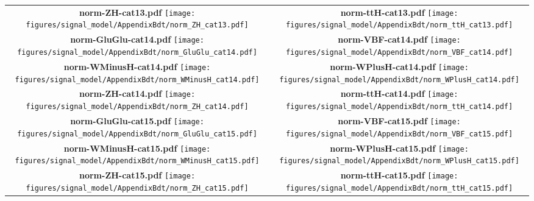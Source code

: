 \begin{longtable}{|c|c|}
{}
 \\
\hline
\parbox{0.47\textwidth}{
\centering
{\bfseries norm-ZH-cat13.pdf}
\texttt{[image: figures/signal\_model/AppendixBdt/norm\_ZH\_cat13.pdf]}
}
 & \parbox{0.47\textwidth}{
\centering
{\bfseries norm-ttH-cat13.pdf}
\texttt{[image: figures/signal\_model/AppendixBdt/norm\_ttH\_cat13.pdf]}
}
 \\
\hline
\parbox{0.47\textwidth}{
\centering
{\bfseries norm-GluGlu-cat14.pdf}
\texttt{[image: figures/signal\_model/AppendixBdt/norm\_GluGlu\_cat14.pdf]}
}
 & \parbox{0.47\textwidth}{
\centering
{\bfseries norm-VBF-cat14.pdf}
\texttt{[image: figures/signal\_model/AppendixBdt/norm\_VBF\_cat14.pdf]}
}
 \\
\hline
\parbox{0.47\textwidth}{
\centering
{\bfseries norm-WMinusH-cat14.pdf}
\texttt{[image: figures/signal\_model/AppendixBdt/norm\_WMinusH\_cat14.pdf]}
}
 & \parbox{0.47\textwidth}{
\centering
{\bfseries norm-WPlusH-cat14.pdf}
\texttt{[image: figures/signal\_model/AppendixBdt/norm\_WPlusH\_cat14.pdf]}
}
 \\
\hline
\parbox{0.47\textwidth}{
\centering
{\bfseries norm-ZH-cat14.pdf}
\texttt{[image: figures/signal\_model/AppendixBdt/norm\_ZH\_cat14.pdf]}
}
 & \parbox{0.47\textwidth}{
\centering
{\bfseries norm-ttH-cat14.pdf}
\texttt{[image: figures/signal\_model/AppendixBdt/norm\_ttH\_cat14.pdf]}
}
 \\
\hline
\parbox{0.47\textwidth}{
\centering
{\bfseries norm-GluGlu-cat15.pdf}
\texttt{[image: figures/signal\_model/AppendixBdt/norm\_GluGlu\_cat15.pdf]}
}
 & \parbox{0.47\textwidth}{
\centering
{\bfseries norm-VBF-cat15.pdf}
\texttt{[image: figures/signal\_model/AppendixBdt/norm\_VBF\_cat15.pdf]}
}
 \\
\hline
\parbox{0.47\textwidth}{
\centering
{\bfseries norm-WMinusH-cat15.pdf}
\texttt{[image: figures/signal\_model/AppendixBdt/norm\_WMinusH\_cat15.pdf]}
}
 & \parbox{0.47\textwidth}{
\centering
{\bfseries norm-WPlusH-cat15.pdf}
\texttt{[image: figures/signal\_model/AppendixBdt/norm\_WPlusH\_cat15.pdf]}
}
 \\
\hline
\parbox{0.47\textwidth}{
\centering
{\bfseries norm-ZH-cat15.pdf}
\texttt{[image: figures/signal\_model/AppendixBdt/norm\_ZH\_cat15.pdf]}
}
 & \parbox{0.47\textwidth}{
\centering
{\bfseries norm-ttH-cat15.pdf}
\texttt{[image: figures/signal\_model/AppendixBdt/norm\_ttH\_cat15.pdf]}
}
 \\
\hline
\end{longtable}
